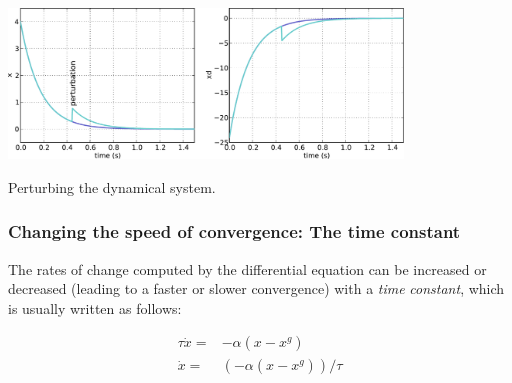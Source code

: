 \begin{DoxyImage}
\includegraphics[height=4cm]{perturb-svg}
\caption{Perturbing the dynamical system.}
\end{DoxyImage}
\hypertarget{page_dyn_sys_sec_dyn_sys_time_constant}{}\subsubsection{Changing the speed of convergence\+: The time constant}\label{page_dyn_sys_sec_dyn_sys_time_constant}
The rates of change computed by the differential equation can be increased or decreased (leading to a faster or slower convergence) with a {\itshape time} {\itshape constant}, which is usually written as follows\+:

\begin{eqnarray*} \tau\dot{x} =& -\alpha(x-x^g)\\ \dot{x} =& (-\alpha(x-x^g))/\tau \end{eqnarray*}

